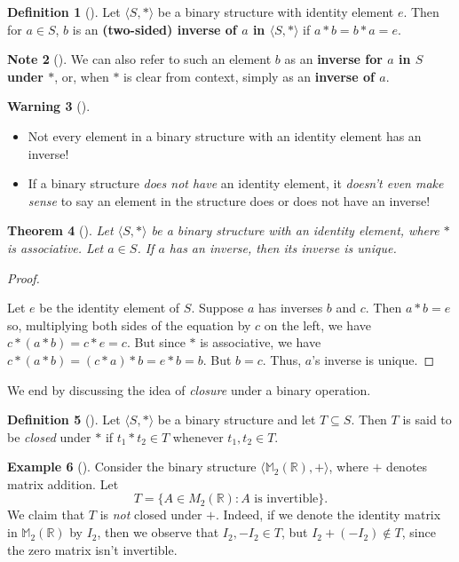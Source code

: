 \documentclass[10pt,]{book}
\newcommand{\terminology}[1]{\textbf{#1}}
\theoremstyle{plain}
\newtheorem{theorem}{Theorem}[section]
\theoremstyle{definition}
\newtheorem{definition}[theorem]{Definition}
\theoremstyle{definition}
\newtheorem{note}[theorem]{Note}
\newtheorem{warning}[theorem]{Warning}
\theoremstyle{definition}
\newtheorem{example}[theorem]{Example}
\theoremstyle{definition}
\numberwithin{equation}{section}
\def\R{\mathbb{R}}
\def\M{\mathbb{M}}
\begin{document}
\begin{definition}[{}]\label{definition-18}
Let \(\langle S, *\rangle\) be a binary structure with identity element \(e\). Then for \(a\in S\), \(b\) is an \terminology{(two-sided) inverse of \(a\) in \(\langle S,*\rangle\)} if \(a*b=b*a=e\).%
\end{definition}
\begin{note}[]\label{note-5}
We can also refer to such an element \(b\) as an \terminology{inverse for \(a\) in \(S\) under \(*\)}, or, when \(*\) is clear from context, simply as an \terminology{inverse of \(a\)}.%
\end{note}
\begin{warning}[]\label{warning-5}
\leavevmode%
\begin{itemize}[label=\textbullet]
\item{}Not every element in a binary structure with an identity element has an inverse!%
\item{}If a binary structure \emph{does not have} an identity element, it \emph{doesn't even make sense} to say an element in the structure does or does not have an inverse!%
\end{itemize}
%
\end{warning}
\begin{theorem}[{}]\label{uniqueinverse}
Let \(\langle S, *\rangle\) be a binary structure with an identity element, where \(*\) is associative. Let \(a\in S\). If \(a\) has an inverse, then its inverse is unique.%
\end{theorem}
\begin{proof}\hypertarget{proof-6}{}
Let \(e\) be the identity element of \(S\). Suppose \(a\) has inverses \(b\) and \(c\). Then \(a*b=e\) so, multiplying both sides of the equation by \(c\) on the left, we have \(c*(a*b)=c*e=c\). But since \(*\) is associative, we have \(c*(a*b)=(c*a)*b=e*b=b\). But \(b=c\). Thus, \(a\)'s inverse is unique.%
\end{proof}
We end by discussing the idea of \emph{closure} under a binary operation.%
\begin{definition}[{}]\label{definition-19}
Let \(\langle S,*\rangle\) be a binary structure and let \(T \subseteq S\). Then \(T\) is said to be \emph{closed} under \(*\) if \(t_1 * t_2 \in T\) whenever \(t_1,t_2\in T\).%
\end{definition}
\begin{example}[]\label{closed1}
Consider the binary structure \(\langle \M_2(\R), +\rangle\), where \(+\) denotes matrix addition.  Let \[T=\{A\in M_2(\R): A \mbox{ is invertible}\}.\]  We claim that \(T\) is \emph{not} closed under \(+\). Indeed, if we denote the identity matrix in \(\M_2(\R)\) by \(I_2\), then we observe that \(I_2, -I_2\in T\), but \(I_2+(-I_2)\not\in T\), since the zero matrix isn't invertible.%
\end{example}
\end{document}
